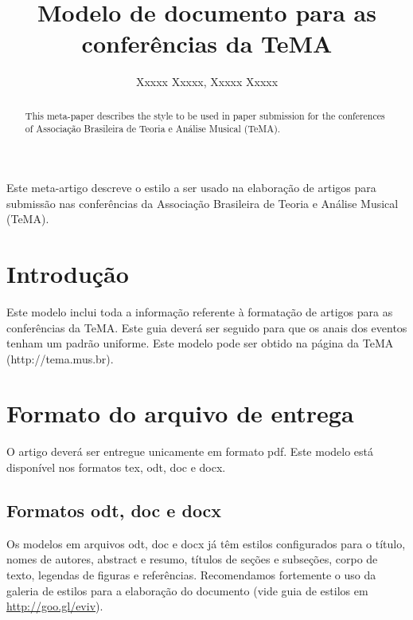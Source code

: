 \documentclass[12pt]{article}
\title{Modelo de documento para as conferências da TeMA}
\author{Xxxxx Xxxxx\inst{1}, Xxxxx Xxxxx\inst{2}}
\begin{document}
\maketitle

\begin{abstract}
  This meta-paper describes the style to be used in paper submission
  for the conferences of Associação Brasileira de Teoria e Análise
  Musical (TeMA).
\end{abstract}


\begin{resumo}
  Este meta-artigo descreve o estilo a ser usado na elaboração de
  artigos para submissão nas conferências da Associação Brasileira de
  Teoria e Análise Musical (TeMA).
\end{resumo}


\section{Introdução}
\label{sec:gen}

Este modelo inclui toda a informação referente à formatação de artigos
para as conferências da TeMA. Este guia deverá ser seguido para que os
anais dos eventos tenham um padrão uniforme. Este modelo pode ser
obtido na página da TeMA (http://tema.mus.br).

\section{Formato do arquivo de entrega}
\label{sec:formato-arquivo}

O artigo deverá ser entregue unicamente em formato pdf. Este modelo
está disponível nos formatos tex, odt, doc e docx.

\subsection{Formatos odt, doc e docx}
\label{sec:formatos-odt-doc}

Os modelos em arquivos odt, doc e docx já têm estilos configurados
para o título, nomes de autores, abstract e resumo, títulos de seções
e subseções, corpo de texto, legendas de figuras e referências.
Recomendamos fortemente o uso da galeria de estilos para a elaboração
do documento (vide guia de estilos em \url{http://goo.gl/eviv}).
\end{document}
